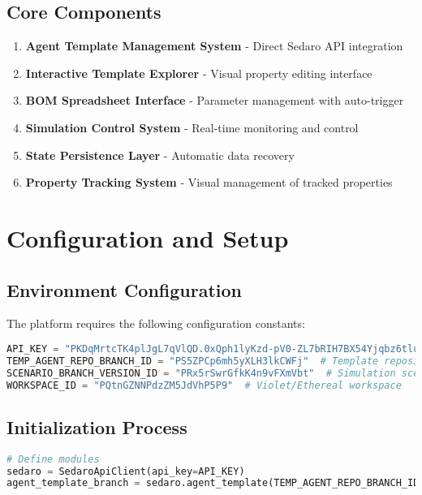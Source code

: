 \documentclass[12pt,a4paper]{article}
\begin{document}
\subsection{Core Components}
\begin{enumerate}
    \item \textbf{Agent Template Management System} - Direct Sedaro API integration
    \item \textbf{Interactive Template Explorer} - Visual property editing interface
    \item \textbf{BOM Spreadsheet Interface} - Parameter management with auto-trigger
    \item \textbf{Simulation Control System} - Real-time monitoring and control
    \item \textbf{State Persistence Layer} - Automatic data recovery
    \item \textbf{Property Tracking System} - Visual management of tracked properties
\end{enumerate}

\section{Configuration and Setup}

\subsection{Environment Configuration}
The platform requires the following configuration constants:

\begin{lstlisting}[language=Python, caption=Platform Configuration]
API_KEY = "PKDqMrtcTK4plJgL7qVlQD.0xQph1lyKzd-pV0-ZL7bRIH7BX54Yjqbz6tluwut3Hvp8XE-RVbfHSz2o5vC77scUhg2xBFuBybplxY6FyXXMQ"
TEMP_AGENT_REPO_BRANCH_ID = "PS5ZPCp6mh5yXLH3lkCWFj"  # Template repository
SCENARIO_BRANCH_VERSION_ID = "PRx5rSwrGfkK4n9vFXmVbt"  # Simulation scenario
WORKSPACE_ID = "PQtnGZNNPdzZM5JdVhP5P9"  # Violet/Ethereal workspace
\end{lstlisting}

\subsection{Initialization Process}
\begin{lstlisting}[language=Python, caption=Platform Initialization]
# Define modules
sedaro = SedaroApiClient(api_key=API_KEY)
agent_template_branch = sedaro.agent_template(TEMP_AGENT_REPO_BRANCH_ID)
\end{lstlisting}
\end{document}
